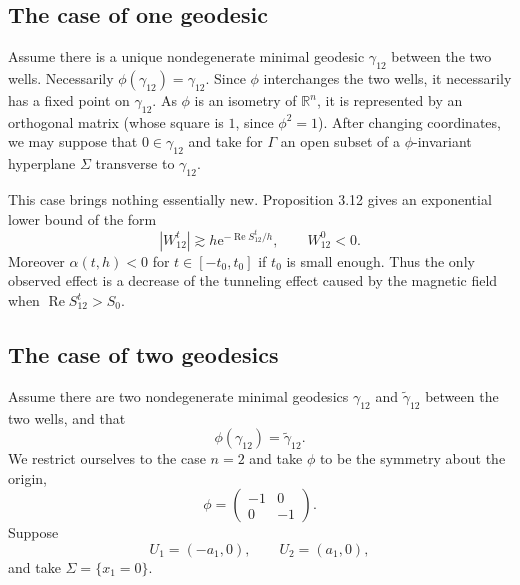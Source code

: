 \documentclass[11pt]{article}
\newcommand{\R}{\mathbb{R}}
\newcommand{\Ree}{\operatorname{Re}}
\newcommand{\e}{\mathrm{e}}
\begin{document}
\subsection*{The case of one geodesic}
Assume there is a unique nondegenerate minimal geodesic $\gamma_{12}$ between the two wells. Necessarily $\phi(\gamma_{12})=\gamma_{12}$. Since $\phi$ interchanges the two wells, it necessarily has a fixed point on $\gamma_{12}$. As $\phi$ is an isometry of $\R^n$, it is represented by an orthogonal matrix (whose square is $1$, since $\phi^2=1$). After changing coordinates, we may suppose that $0\in\gamma_{12}$ and take for $\Gamma$ an open subset of a $\phi$-invariant hyperplane $\Sigma$ transverse to $\gamma_{12}$.

This case brings nothing essentially new. Proposition 3.12 gives an exponential lower bound of the form
\[
|W_{12}^t|\gtrsim h\e^{-\Ree S_{12}^t/h},
\qquad W_{12}^0<0.
\]
Moreover $\alpha(t,h)<0$ for $t\in[-t_0,t_0]$ if $t_0$ is small enough. Thus the only observed effect is a decrease of the tunneling effect caused by the magnetic field when $\Ree S_{12}^t>S_0$.

\subsection*{The case of two geodesics}
Assume there are two nondegenerate minimal geodesics $\gamma_{12}$ and $\widetilde\gamma_{12}$ between the two wells, and that
\[
\phi(\gamma_{12})=\widetilde\gamma_{12}.
\]
We restrict ourselves to the case $n=2$ and take $\phi$ to be the symmetry about the origin,
\[
\phi=\begin{pmatrix}-1&0\\0&-1\end{pmatrix}.
\]
Suppose
\[
U_1=(-a_1,0),\qquad U_2=(a_1,0),
\]
and take $\Sigma=\{x_1=0\}$.

\begin{center}
\end{center}
\end{document}
